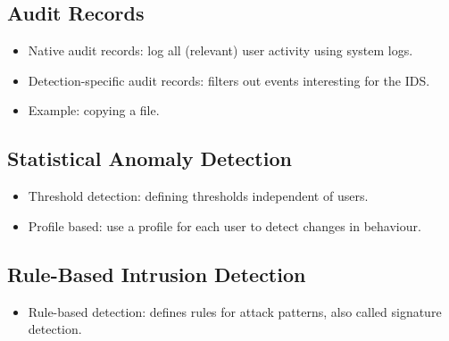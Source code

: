 \documentclass{beamer}
\begin{document}
\subsection{Audit Records}

\begin{frame}{\insertsubsectionhead}
  \begin{itemize}
    \item Native audit records: log all (relevant) user activity using system 
      logs.

    \item Detection-specific audit records: filters out events interesting for 
      the IDS.
      
    \item Example: copying a file.

  \end{itemize}
\end{frame}

\subsection{Statistical Anomaly Detection}

\begin{frame}{\insertsubsectionhead}
  \begin{itemize}
    \item Threshold detection: defining thresholds independent of users.

    \item Profile based: use a profile for each user to detect changes in 
      behaviour.

  \end{itemize}
\end{frame}

\subsection{Rule-Based Intrusion Detection}

\begin{frame}{\insertsubsectionhead}
  \begin{itemize}
    \item Rule-based detection: defines rules for attack patterns, also called 
      signature detection.
  \end{itemize}
\end{frame}

%
\end{document}
